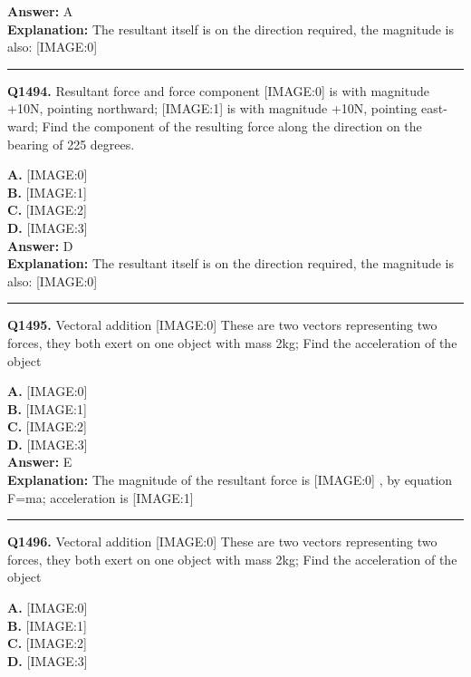 \documentclass[12pt]{article}
\begin{document}
\textbf{Answer:} A \\
\textbf{Explanation:} The resultant itself is on the direction required, the magnitude is also:
[IMAGE:0]

\hrule
\vspace{1em}


\noindent
\textbf{Q1494.} Resultant force and force component
[IMAGE:0]
is with magnitude +10N, pointing northward;
[IMAGE:1]
is with magnitude +10N, pointing east-ward; Find the component of the resulting force along the direction on the bearing of 225 degrees.



\textbf{A.} [IMAGE:0] \\
\textbf{B.} [IMAGE:1] \\
\textbf{C.} [IMAGE:2] \\
\textbf{D.} [IMAGE:3] \\

\textbf{Answer:} D \\
\textbf{Explanation:} The resultant itself is on the direction required, the magnitude is also:
[IMAGE:0]

\hrule
\vspace{1em}


\noindent
\textbf{Q1495.} Vectoral addition
[IMAGE:0]
These are two vectors representing two forces, they both exert on one object with mass 2kg; Find the acceleration of the object



\textbf{A.} [IMAGE:0] \\
\textbf{B.} [IMAGE:1] \\
\textbf{C.} [IMAGE:2] \\
\textbf{D.} [IMAGE:3] \\

\textbf{Answer:} E \\
\textbf{Explanation:} The magnitude of the resultant force is
[IMAGE:0]
, by equation F=ma; acceleration is
[IMAGE:1]

\hrule
\vspace{1em}


\noindent
\textbf{Q1496.} Vectoral addition
[IMAGE:0]
These are two vectors representing two forces, they both exert on one object with mass 2kg; Find the acceleration of the object



\textbf{A.} [IMAGE:0] \\
\textbf{B.} [IMAGE:1] \\
\textbf{C.} [IMAGE:2] \\
\textbf{D.} [IMAGE:3] \\
\end{document}
